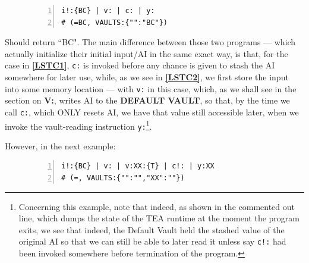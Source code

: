 \documentclass[a4paper, 18pt]{book} %
\begin{document}
\begin{figure}[H]
 \Large
  \centering
  \begin{tcolorbox}[teaterminalstyle, title=TEA Program: \texttt{c:} does not clear DEFAULT VAULT]
  \begin{lstlisting}[language=TEA, caption={TP C2}, label={LSTC2}, numbers=left]
i!:{BC} | v: | c: | y:
# (=BC, VAULTS:{"":"BC"})
   \end{lstlisting}
  \end{tcolorbox}
\end{figure}

Should return ``BC". The main difference between those two programs --- which actually initialize their initial input/AI in the same exact way, is that, for the case in \textbf{\autoref{LSTC1}}, \texttt{c:} is invoked before any chance is given to stash the AI somewhere for later use, while, as we see in \textbf{\autoref{LSTC2}}, we first store the input into some memory location --- with \texttt{v:} in this case, which, as we shall see in the section on \textbf{V:}, writes AI to the \textbf{DEFAULT VAULT}, so that, by the time we call \texttt{c:}, which ONLY resets AI, we have that value still accessible later, when we invoke the vault-reading instruction \texttt{y:}\footnote{Concerning this example, note that indeed, as shown in the commented out line, which dumps the state of the TEA runtime at the moment the program exits, we see that indeed, the Default Vault held the stashed value of the original AI so that we can still be able to later read it unless say \texttt{c!:} had been invoked somewhere before termination of the program.}.

However, in the next example:


\begin{figure}[H]
 \Large
  \centering
  \begin{tcolorbox}[teaterminalstyle, title=TEA Program: \texttt{c!:} resets all memory]
  \begin{lstlisting}[language=TEA, caption={TP C3}, label={LSTC3}, numbers=left]
i!:{BC} | v: | v:XX:{T} | c!: | y:XX
# (=, VAULTS:{"":"","XX":""})
   \end{lstlisting}
  \end{tcolorbox}
\end{figure}
\end{document}
